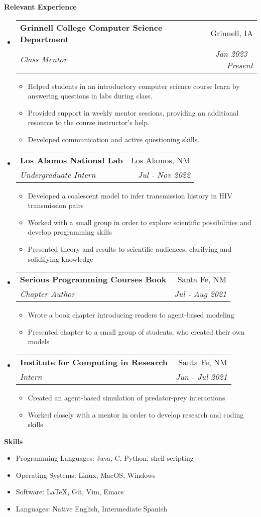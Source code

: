 \documentclass[letterpaper,11pt]{article}
\makeatletter
\newcommand{\resitem}[1]{\item #1 \vspace{-2pt}}
\newcommand{\resheading}[1]{{\large \colorbox{mygrey}{\begin{minipage}{\textwidth}{\textbf{#1 \vphantom{p\^{E}}}}\end{minipage}}}}
\newcommand{\ressubheading}[4]{
\begin{tabular*}{7.0in}{l@{\extracolsep{\fill}}r}
		\textbf{#1} & #2 \\
		\textit{#3} & \textit{#4} \\
\end{tabular*}\vspace{-6pt}}
\makeatother
\begin{document}
\resheading{Relevant Experience}
\begin{itemize}
\item
    \ressubheading{Grinnell College Computer Science Department}{Grinnell,
	IA}{Class Mentor}{Jan 2023 - Present}
	\begin{itemize}
		\resitem{Helped students in an introductory computer science course learn
		by answering questions in labs during class.}
		\resitem{Provided support in weekly mentor sessions,
                providing an additional resource to the course instructor's
		help.}
		\resitem{Developed
		communication and active questioning skills.} 
	\end{itemize}

\item
    \ressubheading{Los Alamos National Lab}{Los Alamos, NM}{Undergraduate Intern}{Jul - Nov 2022}
	\begin{itemize}
		\resitem{Developed a coalescent model to infer transmission history in HIV transmission pairs}
		\resitem{Worked with a small group in order to explore scientific possibilities and develop programming skills}
		\resitem{Presented theory and results to scientific audiences, clarifying and solidifying knowledge}
	\end{itemize}

\item
    \ressubheading{Serious Programming Courses Book}{Santa Fe, NM}{Chapter Author}{Jul - Aug 2021}
	\begin{itemize}
		\resitem{Wrote a book chapter introducing readers to agent-based modeling}
		\resitem{Presented chapter to a small group of students, who created their own models}
	\end{itemize}

\item
    \ressubheading{Institute for Computing in Research}{Santa Fe, NM}{Intern}{Jun - Jul 2021}
	\begin{itemize}
		\resitem{Created an agent-based simulation of predator-prey interactions}
		\resitem{Worked closely with a mentor in order to develop research and coding skills} 
	\end{itemize}
\end{itemize}


\resheading{Skills}
\begin{itemize}
    \item
        {Programming Languages: Java, C, Python, shell scripting}
    \item
        {Operating Systems: Linux, MacOS, Windows}
    \item
	{Software: \LaTeX, Git, Vim, Emacs}
    \item
        {Languages: Native English, Intermediate Spanish}
\end{itemize}
\end{document}
